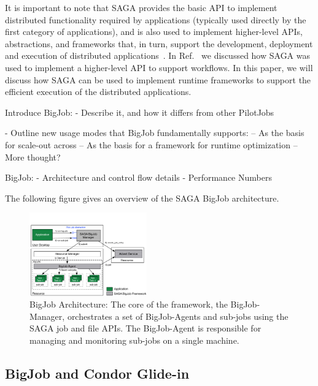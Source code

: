 \documentclass[conference,final]{IEEEtran}
\begin{document}
   It is important to note that SAGA provides the basic API to
   implement distributed functionality required by applications
   (typically used directly by the first category of applications),
   and is also used to implement higher-level APIs, abstractions, and
   frameworks that, in turn, support the development, deployment and
   execution of distributed
   applications~\cite{gmac09,saga_data_intensive_abstractions}. In
   Ref.~\cite{saga_montage} we discussed how SAGA was used to
   implement a higher-level API to support workflows. In this paper, 
   we will discuss how SAGA can be used to implement runtime
   frameworks to support the efficient execution of the distributed
   applications.



Introduce BigJob:
 - Describe it, and how it differs from other PilotJobs

 - Outline new usage modes that BigJob fundamentally supports:
    -- As the basis for scale-out across
    -- As the basis for a framework for runtime optimization
    -- More thought?

BigJob:
 - Architecture and control flow details
 - Performance Numbers


The following figure gives an overview of the SAGA BigJob architecture.

\begin{figure}[htbp]
    \centering
    \includegraphics[width=0.45\textwidth]{figures/bigjob}
    \caption{BigJob Architecture: The core of the framework, the BigJob-Manager,
     orchestrates a set of BigJob-Agents and sub-jobs using the SAGA job and file APIs. 
     The BigJob-Agent is responsible for managing and monitoring sub-jobs on a 
     single machine.}
    \label{fig:figures_bigjob}
\end{figure}

\subsection{BigJob and Condor Glide-in}
\end{document}
